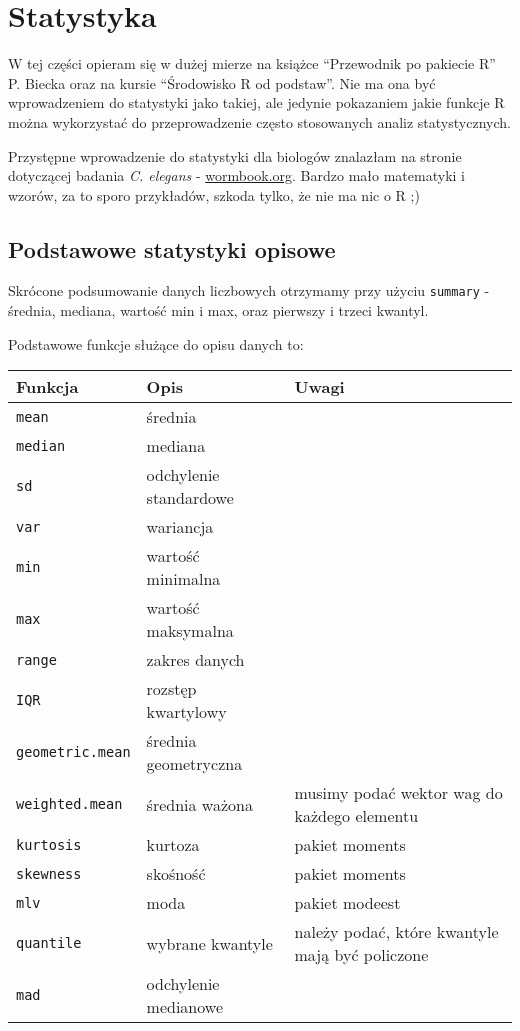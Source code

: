 \documentclass[
]{book}
\begin{document}
\hypertarget{statystyka}{%
\chapter{Statystyka}\label{statystyka}}

W tej części opieram się w dużej mierze na książce ``Przewodnik po pakiecie R'' P. Biecka oraz na kursie ``Środowisko R od podstaw''. Nie ma ona być wprowadzeniem do statystyki jako takiej, ale jedynie pokazaniem jakie funkcje R można wykorzystać do przeprowadzenie często stosowanych analiz statystycznych.

Przystępne wprowadzenie do statystyki dla biologów znalazłam na stronie dotyczącej badania \emph{C. elegans} - \href{http://www.wormbook.org/chapters/www_statisticalanalysis/statisticalanalysis.html\#sec1}{wormbook.org}. Bardzo mało matematyki i wzorów, za to sporo przykładów, szkoda tylko, że nie ma nic o R ;)

\hypertarget{podstawowe-statystyki-opisowe}{%
\section{Podstawowe statystyki opisowe}\label{podstawowe-statystyki-opisowe}}

Skrócone podsumowanie danych liczbowych otrzymamy przy użyciu \texttt{summary} - średnia, mediana, wartość min i max, oraz pierwszy i trzeci kwantyl.

Podstawowe funkcje służące do opisu danych to:

\begin{longtable}[]{@{}lll@{}}
\toprule
Funkcja & Opis & Uwagi \\
\midrule
\endhead
\texttt{mean} & średnia & \\
\texttt{median} & mediana & \\
\texttt{sd} & odchylenie standardowe & \\
\texttt{var} & wariancja & \\
\texttt{min} & wartość minimalna & \\
\texttt{max} & wartość maksymalna & \\
\texttt{range} & zakres danych & \\
\texttt{IQR} & rozstęp kwartylowy & \\
\texttt{geometric.mean} & średnia geometryczna & \\
\texttt{weighted.mean} & średnia ważona & musimy podać wektor wag do każdego elementu \\
\texttt{kurtosis} & kurtoza & pakiet moments \\
\texttt{skewness} & skośność & pakiet moments \\
\texttt{mlv} & moda & pakiet modeest \\
\texttt{quantile} & wybrane kwantyle & należy podać, które kwantyle mają być policzone \\
\texttt{mad} & odchylenie medianowe & \\
\bottomrule
\end{longtable}
\end{document}
